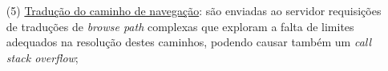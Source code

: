 \begin{itemize}
        \item[(5)] \underline{Tradução do caminho de navegação}: são enviadas ao servidor requisições de traduções de \textit{browse path} complexas que exploram a falta de limites adequados na resolução destes caminhos, podendo causar também um \textit{call stack overflow};
    \end{itemize}

